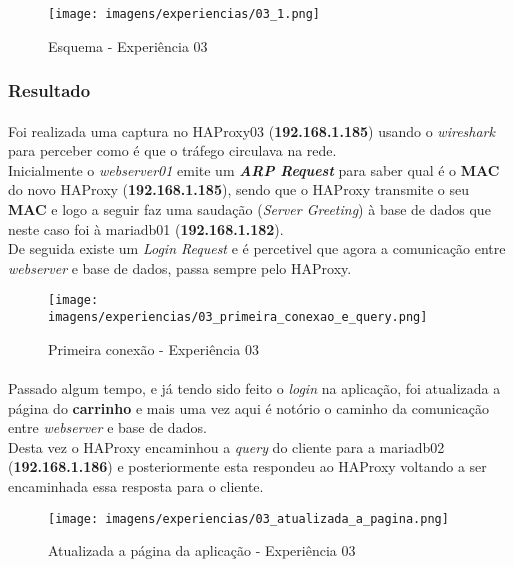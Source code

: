 \documentclass{report}
\begin{document}
\begin{figure}[H]
\center
\texttt{[image: imagens/experiencias/03\_1.png]}
\caption{Esquema - Experiência 03}
\label{fig.nav}
\end{figure}
\clearpage
\subsubsection{Resultado}
\paragraph{}
Foi realizada uma captura no HAProxy03 (\textbf{192.168.1.185}) usando o \emph{wireshark} para perceber como é que o tráfego circulava na rede.\\

Inicialmente o \emph{webserver01} emite um \textbf{\emph{ARP Request}} para saber qual é o \textbf{MAC} do novo HAProxy (\textbf{192.168.1.185}), sendo que o HAProxy transmite o seu \textbf{MAC} e logo a seguir faz uma saudação (\emph{Server Greeting}) à base de dados que neste caso foi à mariadb01 (\textbf{192.168.1.182}).\\
De seguida existe um \emph{Login Request} e é percetivel que agora a comunicação entre \emph{webserver} e base de dados, passa sempre pelo HAProxy.

\begin{figure}[H]
\center
\texttt{[image: imagens/experiencias/03\_primeira\_conexao\_e\_query.png]}
\caption{Primeira conexão - Experiência 03}
\label{fig.nav}
\end{figure}

\paragraph{}
Passado algum tempo, e já tendo sido feito o \emph{login} na aplicação, foi atualizada a página do \textbf{carrinho} e mais uma vez aqui é notório o caminho da comunicação entre \emph{webserver} e base de dados.\\
Desta vez o HAProxy encaminhou a \emph{query} do cliente para a mariadb02 (\textbf{192.168.1.186}) e posteriormente esta respondeu ao HAProxy voltando a ser encaminhada essa resposta para o cliente.

\begin{figure}[H]
\center
\texttt{[image: imagens/experiencias/03\_atualizada\_a\_pagina.png]}
\caption{Atualizada a página da aplicação - Experiência 03}
\label{fig.nav}
\end{figure}
\end{document}
